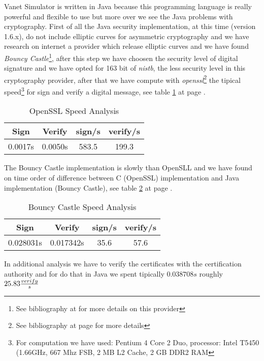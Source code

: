 Vanet Simulator is written in Java because this programming language is really powerful and flexible to use but more over we see the Java problems with cryptography. First of all the Java security implementation, at this time (version 1.6.x), do not include elliptic curves for asymmetric cryptography and we have research on internet a provider which release elliptic curves and we have found \textit{Bouncy Castle}\footnote{See bibliography at \pageref{bibliography} for more details on this provider}, after this step we have choosen the security level of digital signature and we have opted for 163 bit of \textit{nistb}, the less security level in this cryptography provider, after that we have compute with \emph{openssl}\footnote{See bibliography at page \pageref{bibliography} for more details} the tipical speed\footnote{For computation we have used: Pentium 4 Core 2 Duo, processor: Intel T5450 (1.66GHz, 667 Mhz FSB, 2 MB L2 Cache, 2 GB DDR2 RAM} for sign and verify a digital message, see table \ref{tab:OpensslVelocity} at page \pageref{tab:OpensslVelocity}.
\begin{table}[!ht]
	\centering
	\caption{OpenSSL Speed Analysis}
	\begin{tabular}{|c|c|c|c|}
	\hline\hline 
	\textbf{Sign} & \textbf{Verify} & \textbf{sign/s} & \textbf{verify/s} \\
	\hline
	0.0017s & 0.0050s & 583.5 & 199.3 \\
	\hline
	\hline     %
 	\end{tabular} 
	\label{tab:OpensslVelocity}
\end{table}
The Bouncy Castle implementation is slowly than OpenSLL and we have found on time order of difference between C (OpenSSL)  implementation and Java implementation (Bouncy Castle), see table \ref{tab:BouncyCastleVelocity} at page \pageref{tab:BouncyCastleVelocity}.
\begin{table}[!ht]
	\centering
	\caption{Bouncy Castle Speed Analysis}
	\begin{tabular}{|c|c|c|c|}
	\hline\hline 
	\textbf{Sign} & \textbf{Verify} & \textbf{sign/s} & \textbf{verify/s} \\
	\hline
	0.028031s & 0.017342s & 35.6 & 57.6 \\
	\hline
	\hline     %
 	\end{tabular} 
	\label{tab:BouncyCastleVelocity}
\end{table}
In additional analysis we have to verify the certificates with the certification authority and for do that in Java we spent tipically $0.038708s$ roughly $25.83 {verify \over s}$
